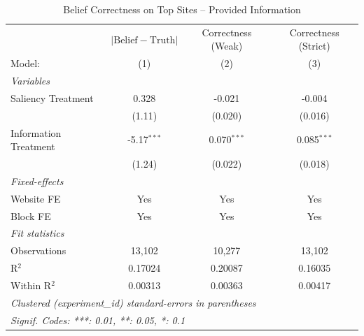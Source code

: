
\begin{table}[htbp]
   \caption{Belief Correctness on Top Sites -- Provided Information}
   \centering
   \begin{tabular}{lccc}
      \tabularnewline \midrule \midrule
                            & $\lvert \text{Belief} - \text{Truth} \rvert$     & Correctness (Weak) & Correctness (Strict) \\   
      Model:                & (1)                                              & (2)                & (3)\\  
      \midrule
      \emph{Variables}\\
      Saliency Treatment    & 0.328                                            & -0.021             & -0.004\\   
                            & (1.11)                                           & (0.020)            & (0.016)\\   
      Information Treatment & -5.17$^{***}$                                    & 0.070$^{***}$      & 0.085$^{***}$\\   
                            & (1.24)                                           & (0.022)            & (0.018)\\   
      \midrule
      \emph{Fixed-effects}\\
      Website FE            & Yes                                              & Yes                & Yes\\  
      Block FE              & Yes                                              & Yes                & Yes\\  
      \midrule
      \emph{Fit statistics}\\
      Observations          & 13,102                                           & 10,277             & 13,102\\  
      R$^2$                 & 0.17024                                          & 0.20087            & 0.16035\\  
      Within R$^2$          & 0.00313                                          & 0.00363            & 0.00417\\  
      \midrule \midrule
      \multicolumn{4}{l}{\emph{Clustered (experiment\_id) standard-errors in parentheses}}\\
      \multicolumn{4}{l}{\emph{Signif. Codes: ***: 0.01, **: 0.05, *: 0.1}}\\
   \end{tabular}
\end{table}


